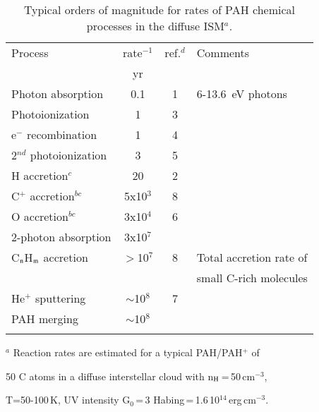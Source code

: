 \documentclass{aa}
\begin{document}
\begin{table}[htbp]
      \caption[]{Typical orders of magnitude for rates of PAH chemical processes in the diffuse ISM$^a$.}
         \label{tab:lines}
            \begin{tabular}{ l c c  l    }
            \hline 
           \noalign{\smallskip}
 {\small Process} &   {\small rate$^{-1}$}  &{\tiny ref.}$^d$  &  {\small 
 Comments} \\
{\tiny   }  & {\small yr}   &   &  {\tiny }   \\
      \noalign{\smallskip}      
{\tiny   Photon absorption}   & {\small  0.1}  &  {\small  1} &  {\tiny 6-13.6~eV photons}   \\
{\tiny  Photoionization }   &{\small  1}   &  {\small  3} &  {\tiny }   \\
{\tiny  e$^-$ recombination}   & {\small  1}  & {\tiny 4} &  {\tiny }   \\
{\tiny  2$^{nd}$ photoionization }   & {\small  3}  & {\small  5} &  {\tiny }   \\
{\tiny   H accretion}$^{c}$   & {\small  20}  & {\small  2} &  {\tiny }   
\\
{\tiny  C$^+$ accretion}$^{bc}$ & {\small  5x10$^3$}  & {\small  8}  &  {\tiny }   \\
{\tiny   O accretion}$^{bc}$   & {\small  3x10$^4$}  & {\small  6} &  {\tiny }   \\
{\tiny   2-photon absorption}   & {\small 3x10$^7$}  &   &  {\tiny }   \\
{\tiny   C$_{\rm n}$H$_{\rm m}$ accretion}   &  {\small  $>$10$^7$}  & {\small  8} &  {\tiny  Total accretion rate of}\\
{\tiny   }  &    &   &  {\tiny small C-rich molecules}   \\
{\tiny  He$^+$ sputtering }   &  {\small  $\sim$10$^8$}  & {\small  7} &  
{\tiny }   \\
{\tiny  PAH merging}   &  {\small   $\sim$10$^8$}  &   &  {\tiny }\\
      \noalign{\smallskip}
            \noalign{\smallskip}
            \hline
           \end{tabular}
{\small \begin{list}{}{} 
\item[$^a$ Reaction rates are estimated for a typical PAH/PAH$^+$ of] 
\item[50 C atoms in a diffuse interstellar cloud with n$_{\rm H}$\,=\,50\,cm$^{-3}$,]
\item[T=50-100\,K, UV intensity G$_0$\,=\,3 Habing\,=\,1.6\,10$^{14}$\,erg\,cm$^{-3}$.]

\end{list}}
\end{table}
\end{document}

